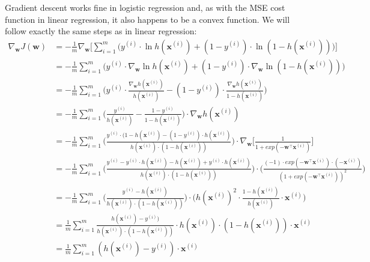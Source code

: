Gradient descent works fine in logistic regression and, as with the MSE cost function in linear regression, it also
happens to be a convex function. We will follow exactly the same steps as in linear regression:
\begingroup
\allowdisplaybreaks
{\setlength{\jot}{10pt}
\begin{align*}
\nabla_{\boldsymbol{w}} J(\boldsymbol{w})
&= - \frac{1}{m} \nabla_{\boldsymbol{w}} \Big[\sum_{i=1}^{m} \Big( y^{(i)} \cdot \ln h(\boldsymbol{x}^{(i)})
+ (1 - {y^{(i)}}) \cdot \ln (1 - h(\boldsymbol{x}^{(i)}))\Big) \Big] \\
&= - \frac{1}{m} \sum_{i=1}^{m} \Big( y^{(i)} \cdot \nabla_{\boldsymbol{w}} \ln h(\boldsymbol{x}^{(i)})
+ (1 - {y^{(i)}}) \cdot \nabla_{\boldsymbol{w}} \ln (1 - h(\boldsymbol{x}^{(i)})) \Big) \\
&= - \frac{1}{m} \sum_{i=1}^{m} \Big( y^{(i)} \cdot \frac{\nabla_{\boldsymbol{w}}
h(\boldsymbol{x}^{(i)})}{h(\boldsymbol{x}^{(i)})} - (1 - {y^{(i)}}) \cdot \frac{\nabla_{\boldsymbol{w}}
h(\boldsymbol{x}^{(i)})}{1 - h(\boldsymbol{x}^{(i)})} \Big)\\
&= - \frac{1}{m} \sum_{i=1}^{m} \Big( \frac{y^{(i)}}{h(\boldsymbol{x}^{(i)})}
- \frac{1 - {y^{(i)}}}{1 - h(\boldsymbol{x}^{(i)})} \Big) \cdot \nabla_{\boldsymbol{w}} h(\boldsymbol{x}^{(i)}) \\
&= - \frac{1}{m} \sum_{i=1}^{m} \Big( \frac{y^{(i)} \cdot (1 - h(\boldsymbol{x}^{(i)}) - (1 - {y^{(i)}})
\cdot h(\boldsymbol{x}^{(i)})}{h(\boldsymbol{x}^{(i)}) \cdot (1- h(\boldsymbol{x}^{(i)}))} \Big)
\cdot \nabla_{\boldsymbol{w}} \Big[ \frac{1}{1 + exp(- \boldsymbol{w}^{\intercal} \boldsymbol{x}^{(i)})} \Big] \\
&= - \frac{1}{m} \sum_{i=1}^{m} \Big( \frac{y^{(i)} - y^{(i)} \cdot h(\boldsymbol{x}^{(i)})
- h(\boldsymbol{x}^{(i)}) + {y^{(i)}} \cdot h(\boldsymbol{x}^{(i)})}{h(\boldsymbol{x}^{(i)})
\cdot (1 - h(\boldsymbol{x}^{(i)}))} \Big) \cdot \Big( \frac{(-1)
\cdot exp(- \boldsymbol{w}^{\intercal} \boldsymbol{x}^{(i)})
\cdot (-\boldsymbol{x}^{(i)})}{(1 + exp(-\boldsymbol{w}^{\intercal} \boldsymbol{x}^{(i)}))^2} \Big) \\
&= - \frac{1}{m} \sum_{i=1}^{m} \Big( \frac{y^{(i)} - h(\boldsymbol{x}^{(i)})}{h(\boldsymbol{x}^{(i)})
\cdot (1 - h(\boldsymbol{x}^{(i)}))} \Big) \cdot \Big( h(\boldsymbol{x}^{(i)})^2
\cdot \frac{1 - h(\boldsymbol{x}^{(i)})}{h(\boldsymbol{x}^{(i)})} \cdot \boldsymbol{x}^{(i)} \Big) \\
&= \frac{1}{m} \sum_{i=1}^{m} \frac{h(\boldsymbol{x}^{(i)}) - y^{(i)})}{h(\boldsymbol{x}^{(i)})
\cdot (1 - h (\boldsymbol{x}^{(i)}))} \cdot h(\boldsymbol{x}^{(i)})
\cdot (1- h(\boldsymbol{x}^{(i)}))\cdot\boldsymbol{x}^{(i)} \\
&= \frac{1}{m} \sum_{i=1}^{m} (h(\boldsymbol{x}^{(i)}) - y^{(i)}) \cdot \boldsymbol{x}^{(i)}
\end{align*}}
\endgroup

